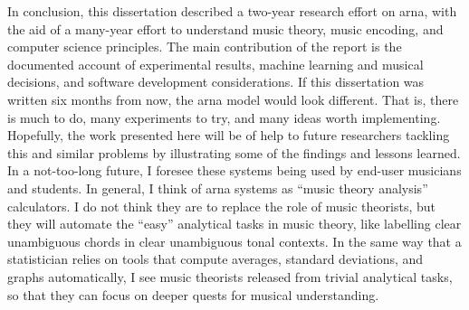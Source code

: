 
In conclusion, this dissertation described a two-year
research effort on \gls{arna}, with the aid of a many-year
effort to understand music theory, music encoding, and
computer science principles. The main contribution of the
report is the documented account of experimental results,
machine learning and musical decisions, and software
development considerations. If this dissertation was written
six months from now, the \gls{arna} model would look
different. That is, there is much to do, many experiments to
try, and many ideas worth implementing. Hopefully, the work
presented here will be of help to future researchers
tackling this and similar problems by illustrating some of
the findings and lessons learned. In a not-too-long future,
I foresee these systems being used by end-user musicians and
students. In general, I think of \gls{arna} systems as
``music theory analysis'' calculators. I do not think they
are to replace the role of music theorists, but they will
automate the ``easy'' analytical tasks in music theory, like
labelling clear unambiguous chords in clear unambiguous
tonal contexts. In the same way that a statistician relies
on tools that compute averages, standard deviations, and
graphs automatically, I see music theorists released from
trivial analytical tasks, so that they can focus on deeper
quests for musical understanding. 
